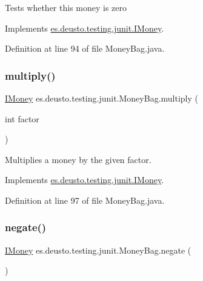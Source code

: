 Tests whether this money is zero 

Implements \hyperlink{interfacees_1_1deusto_1_1testing_1_1junit_1_1_i_money_a166c39b6f931e49769580a04f8c73500}{es.\+deusto.\+testing.\+junit.\+I\+Money}.



Definition at line 94 of file Money\+Bag.\+java.

\mbox{\label{classes_1_1deusto_1_1testing_1_1junit_1_1_money_bag_aa20ce4cc70c2ba0bc9a5ccb96635d506}} 
\subsubsection{\texorpdfstring{multiply()}{multiply()}}
{\footnotesize\ttfamily \hyperlink{interfacees_1_1deusto_1_1testing_1_1junit_1_1_i_money}{I\+Money} es.\+deusto.\+testing.\+junit.\+Money\+Bag.\+multiply (\begin{DoxyParamCaption}\item[{int}]{factor }\end{DoxyParamCaption})}

Multiplies a money by the given factor. 

Implements \hyperlink{interfacees_1_1deusto_1_1testing_1_1junit_1_1_i_money_a09154f9713133d4734f72d6a20081209}{es.\+deusto.\+testing.\+junit.\+I\+Money}.



Definition at line 97 of file Money\+Bag.\+java.

\mbox{\label{classes_1_1deusto_1_1testing_1_1junit_1_1_money_bag_abf06bf97e548f95038756608fe0c8351}} 
\subsubsection{\texorpdfstring{negate()}{negate()}}
{\footnotesize\ttfamily \hyperlink{interfacees_1_1deusto_1_1testing_1_1junit_1_1_i_money}{I\+Money} es.\+deusto.\+testing.\+junit.\+Money\+Bag.\+negate (\begin{DoxyParamCaption}{ }\end{DoxyParamCaption})}

